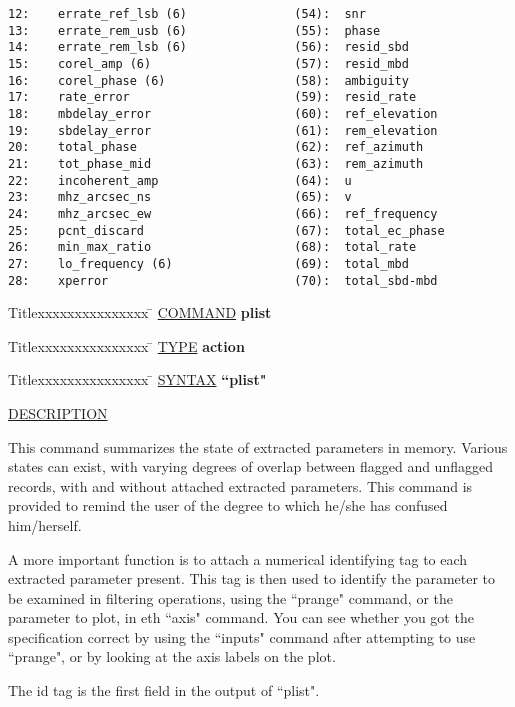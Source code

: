 \begin{list}{}{\setlength{\leftmargin}{0.5in}
     \setlength{\rightmargin}{0in}}
\begin{verbatim}
12:    errate_ref_lsb (6)               (54):  snr
13:    errate_rem_usb (6)               (55):  phase
14:    errate_rem_lsb (6)               (56):  resid_sbd
15:    corel_amp (6)                    (57):  resid_mbd
16:    corel_phase (6)                  (58):  ambiguity
17:    rate_error                       (59):  resid_rate
18:    mbdelay_error                    (60):  ref_elevation
19:    sbdelay_error                    (61):  rem_elevation
20:    total_phase                      (62):  ref_azimuth
21:    tot_phase_mid                    (63):  rem_azimuth
22:    incoherent_amp                   (64):  u
23:    mhz_arcsec_ns                    (65):  v
24:    mhz_arcsec_ew                    (66):  ref_frequency
25:    pcnt_discard                     (67):  total_ec_phase
26:    min_max_ratio                    (68):  total_rate
27:    lo_frequency (6)                 (69):  total_mbd
28:    xperror                          (70):  total_sbd-mbd
\end{verbatim}
\end{list}
\vspace{.2in}

\begin{tabbing}
Titlexxxxxxxxxxxxxxx \= \kill
\underline{COMMAND} \> {\bf 	plist} \\
\end{tabbing}

\begin{tabbing}
Titlexxxxxxxxxxxxxxx \= \kill
\underline{TYPE} \> {\bf 		action} \\
\end{tabbing}

\begin{tabbing}
Titlexxxxxxxxxxxxxxx \= \kill
\underline{SYNTAX} \> {\bf 		``plist"} \\
\end{tabbing}

\underline{DESCRIPTION}
\begin{list}{}{\setlength{\leftmargin}{0.5in}
     \setlength{\rightmargin}{0in}}
\item
This command summarizes the state of extracted parameters in memory.  Various
states can exist, with varying degrees of overlap between flagged and unflagged
records, with and without attached extracted parameters.  This command is
provided to remind the user of the degree to which he/she has confused
him/herself.
\item
A more important function is to attach a numerical identifying tag to each
extracted parameter present.  This tag is then used to identify the parameter
to be examined in filtering operations, using the ``prange" command, or the
parameter to plot, in eth ``axis" command.  You can see whether you got the 
specification correct by using the ``inputs" command after attempting to use 
``prange", or by looking at the axis labels on the plot.
\item
The id tag is the first field in the output of ``plist".
\end{list}
\vspace{.2in}

